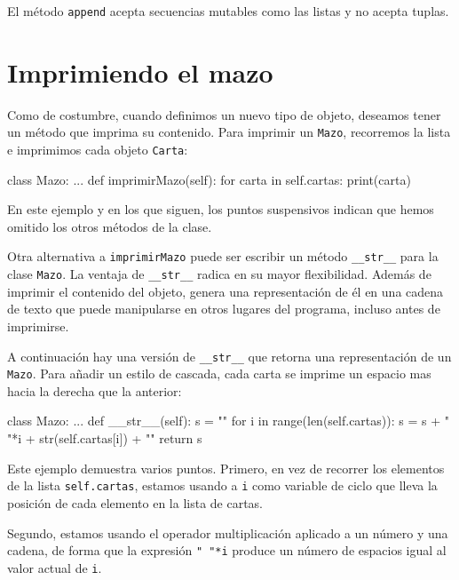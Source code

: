 El método \texttt{append} acepta secuencias mutables como las listas
y no acepta tuplas.

  

\section{Imprimiendo el mazo}

\label{printdeck} 

Como de costumbre, cuando definimos un nuevo tipo de objeto, deseamos
tener un método que imprima su contenido. Para imprimir un \texttt{Mazo},
recorremos la lista e imprimimos cada objeto \texttt{Carta}:
\begin{pythoncode}
class Mazo:
  ...
  def imprimirMazo(self):
    for carta in self.cartas:
      print(carta)
\end{pythoncode}

En este ejemplo y en los que siguen, los puntos suspensivos indican
que hemos omitido los otros métodos de la clase.

Otra alternativa a \texttt{imprimirMazo} puede ser escribir un método
\texttt{\_\_str\_\_} para la clase \texttt{Mazo}. La ventaja de \texttt{\_\_str\_\_}
radica en su mayor flexibilidad. Además de imprimir el contenido del
objeto, genera una representación de él en una cadena de texto que
puede manipularse en otros lugares del programa, incluso antes de
imprimirse.

A continuación hay una versión de \texttt{\_\_str\_\_} que retorna
una representación de un \texttt{Mazo}. Para añadir un estilo de cascada,
cada carta se imprime un espacio mas hacia la derecha que la anterior:
\begin{pythoncode}
class Mazo:
  ...
  def __str__(self):
    s = ""
    for i in range(len(self.cartas)):
      s = s + " "*i + str(self.cartas[i]) + "\n"
    return s
\end{pythoncode}

Este ejemplo demuestra varios puntos. Primero, en vez de recorrer
los elementos de la lista \texttt{self.cartas}, estamos usando a \texttt{i}
como variable de ciclo que lleva la posición de cada elemento en la
lista de cartas.

Segundo, estamos usando el operador multiplicación aplicado a un número
y una cadena, de forma que la expresión \verb+" "*i+ produce un número
de espacios igual al valor actual de \texttt{i}.

